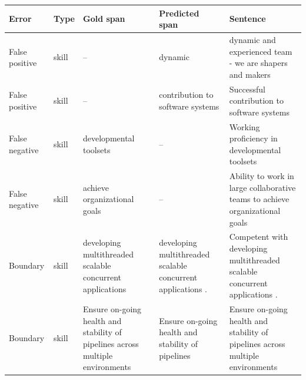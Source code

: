 \begin{tabular}{l l p{2.3cm} p{2.3cm} p{5.2cm}}
\hline
Error & Type & Gold span & Predicted span & Sentence \\
\hline
False positive & skill & -- & dynamic & \footnotesize dynamic and experienced team - we are shapers and makers \\
False positive & skill & -- & contribution to software systems & \footnotesize \textbullet{} Successful contribution to software systems \\
False negative & skill & developmental toolsets & -- & \footnotesize * \textbullet{} Working proficiency in developmental toolsets \\
False negative & skill & achieve organizational goals & -- & \footnotesize * Ability to work in large collaborative teams to achieve organizational goals \\
Boundary & skill & developing multithreaded scalable concurrent applications & developing multithreaded scalable concurrent applications . & \footnotesize * \textbullet{} Competent with developing multithreaded scalable concurrent applications . \\
Boundary & skill & Ensure on-going health and stability of pipelines across multiple environments & Ensure on-going health and stability of pipelines & \footnotesize Ensure on-going health and stability of pipelines across multiple environments \\
\hline
\end{tabular}
